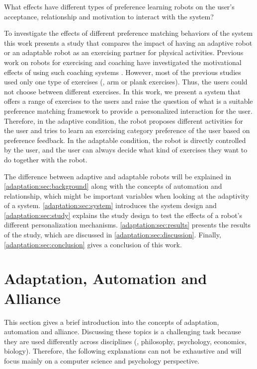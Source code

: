 What effects have different types of preference learning robots on the user's acceptance, relationship and motivation to interact with the system?

To investigate the effects of different preference matching behaviors of the system this work presents a study that compares the impact of having an adaptive robot or an adaptable robot as an exercising partner for physical activities. Previous work on robots for exercising and coaching have investigated the motivational effects of using such coaching systems \cite{fasola2013socially,schneider2016exercising,guneysu2017}. However, most of the previous studies used only one type of exercises (\eg{}, arm or plank exercises). Thus, the users could not choose between different exercises. In this work, we present a system that offers a range of exercises to the users and raise the question of what is a suitable preference matching framework to provide a personalized interaction for the user. Therefore, in the adaptive condition, the robot proposes different activities for the user and tries to learn an exercising category preference of the user based on preference feedback. In the adaptable condition, the robot is directly controlled by the user, and the user can always decide what kind of exercises they want to do together with the robot.

The difference between adaptive and adaptable robots will be explained in \autoref{adaptation:sec:background} along with the concepts of automation and relationship, which might be important variables when looking at the adaptivity of a system. \autoref{adaptation:sec:system} introduces the system design and \autoref{adaptation:sec:study} explains the study design to test the effects of a robot's different personalization mechanisms. \autoref{adaptation:sec:results} presents the results of the study, which are discussed in \autoref{adaptation:sec:discussion}. Finally, \autoref{adaptation:sec:conclusion} gives a conclusion of this work.

\section{Adaptation, Automation and Alliance} \label{adaptation:sec:background}
This section gives a brief introduction into the concepts of adaptation, automation and alliance. Discussing these topics is a challenging task because they are used differently across disciplines (\eg{}, philosophy, psychology, economics, biology). Therefore, the following explanations can not be exhaustive and will focus mainly on a computer science and psychology perspective.
 

